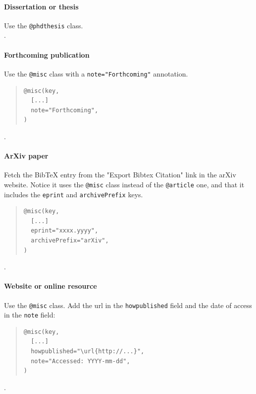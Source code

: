\paragraph{Dissertation or thesis~\nocite{c:79}} Use the \texttt{@phdthesis} class.\\[.2em]
.

\paragraph{Forthcoming publication~\nocite{c:21}} Use the \texttt{@misc} class with a \texttt{note="Forthcoming"} annotation.
\begin{quote}
\begin{footnotesize}
\begin{verbatim}
@misc(key,
  [...]
  note="Forthcoming",
)
\end{verbatim}
\end{footnotesize}
\end{quote}
.

\paragraph{ArXiv paper~\nocite{c:22}} Fetch the BibTeX entry from the "Export Bibtex Citation" link in the arXiv website. Notice it uses the \texttt{@misc} class instead of the \texttt{@article} one, and that it includes the \texttt{eprint} and \texttt{archivePrefix} keys.
\begin{quote}
\begin{footnotesize}
\begin{verbatim}
@misc(key,
  [...]
  eprint="xxxx.yyyy",
  archivePrefix="arXiv",
)
\end{verbatim}
\end{footnotesize}
\end{quote}
.

\paragraph{Website or online resource~\nocite{c:23}} Use the \texttt{@misc} class. Add the url in the \texttt{howpublished} field and the date of access in the \texttt{note} field:
\begin{quote}
\begin{footnotesize}
\begin{verbatim}
@misc(key,
  [...]
  howpublished="\url{http://...}",
  note="Accessed: YYYY-mm-dd",
)
\end{verbatim}
\end{footnotesize}
\end{quote}
.

